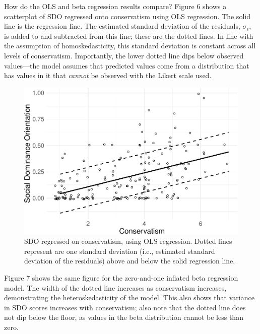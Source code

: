 \documentclass[english,man]{apa6}
\theoremstyle{definition}
\theoremstyle{definition}
\theoremstyle{remark}
\begin{document}
How do the OLS and beta regression results compare? Figure 6 shows a
scatterplot of SDO regressed onto conservatism using OLS regression. The
solid line is the regression line. The estimated standard deviation of
the residuals, \(\sigma_\epsilon\), is added to and subtracted from this
line; these are the dotted lines. In line with the assumption of
homoskedasticity, this standard deviation is constant across all levels
of conservatism. Importantly, the lower dotted line dips below observed
values---the model assumes that predicted values come from a
distribution that has values in it that \emph{cannot} be observed with
the Likert scale used.

\begin{figure}
\centering
\includegraphics{beta_hurdle_files/figure-latex/unnamed-chunk-18-1.pdf}
\caption{\label{fig:unnamed-chunk-18}SDO regressed on conservatism, using
OLS regression. Dotted lines represent are one standard deviation (i.e.,
estimated standard deviation of the residuals) above and below the solid
regression line.}
\end{figure}

Figure 7 shows the same figure for the zero-and-one inflated beta
regression model. The width of the dotted line increases as conservatism
increases, demonstrating the heteroskedasticity of the model. This also
shows that variance in SDO scores increases with conservatism; also note
that the dotted line does not dip below the floor, as values in the beta
distribution cannot be less than zero.
\end{document}
